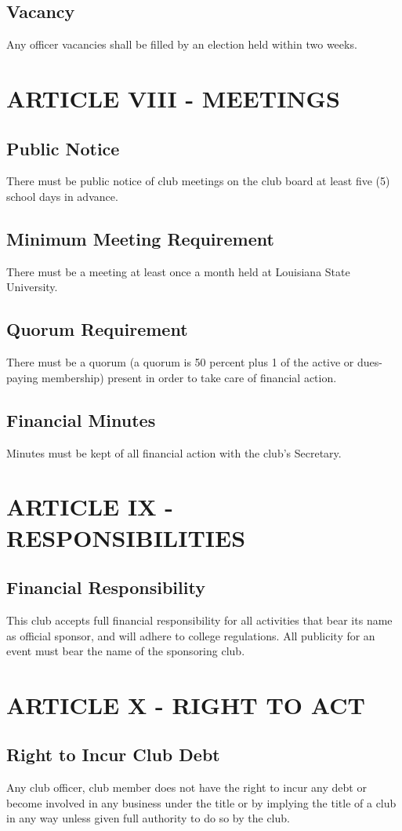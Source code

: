 \documentclass[11pt]{amsart}
\begin{document}
\subsection{Vacancy}
Any officer vacancies shall be filled by an election held within two weeks.


\section{ARTICLE VIII - MEETINGS}
\subsection{Public Notice}
There must be public notice of club meetings on the club board at least five (5) school days in advance.
\subsection{Minimum Meeting Requirement}
There must be a meeting at least once a month held at Louisiana State University.
\subsection{Quorum Requirement}
There must be a quorum (a quorum is 50 percent plus 1 of the active or dues-paying membership) present in order to take care of financial action.
\subsection{Financial Minutes}
Minutes must be kept of all financial action with the club’s Secretary.

\section{ARTICLE IX - RESPONSIBILITIES}
\subsection{Financial Responsibility}
This club accepts full financial responsibility for all activities that bear its name as official sponsor, and will adhere to college regulations.  All publicity for an event must bear the name of the sponsoring club.

\section{ARTICLE X - RIGHT TO ACT}
\subsection{Right to Incur Club Debt}
Any club officer, club member does not have the right to incur any debt or become involved in any business under the title or by implying the title of a club in any way unless given full authority to do so by the club.
\end{document}
